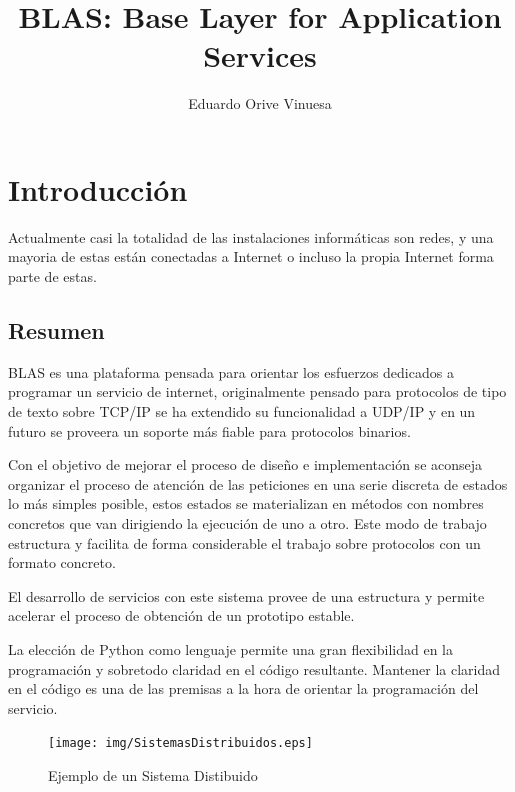 \documentclass[a4paper,spanish,12pt]{book}
\title{BLAS: Base Layer for Application Services}
\author{Eduardo Orive Vinuesa}
\begin{document}
\tableofcontents

\maketitle

\chapter{Introducción}
Actualmente casi la totalidad de las instalaciones inform\'aticas son redes, y una mayoria de estas est\'an conectadas a Internet o incluso la propia Internet forma parte de estas.
\section{Resumen}
BLAS es una plataforma pensada para orientar los esfuerzos dedicados a programar un servicio de internet, originalmente pensado para protocolos de tipo de texto sobre TCP/IP se ha extendido su funcionalidad a UDP/IP y en un futuro se proveera un soporte más fiable para protocolos binarios.

Con el objetivo de mejorar el proceso de diseño e implementación se aconseja organizar el proceso de atención de las peticiones en una serie discreta de estados lo más simples posible, estos estados se materializan en m\'etodos con nombres concretos que van dirigiendo la ejecución de uno a otro. Este modo de trabajo estructura y facilita de forma considerable el trabajo sobre protocolos con un formato concreto.

El desarrollo de servicios con este sistema provee de una estructura y permite acelerar el proceso de obtención de un prototipo estable.

La elección de Python como lenguaje permite una gran flexibilidad en la programación y sobretodo claridad en el código resultante. Mantener la claridad en el código es una de las premisas a la hora de orientar la programación del servicio.

\begin{figure}[h] %
	\texttt{[image: img/SistemasDistribuidos.eps]}	
	\caption{Ejemplo de un Sistema Distibuido}
	\label{fig:SistemasDistribuidos}
\end{figure}
\end{document}
